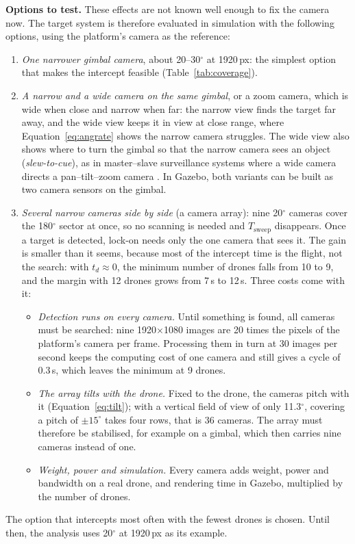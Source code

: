 \textbf{Options to test.} These effects are not known well enough to fix the
camera now. The target system is therefore evaluated in simulation with the
following options, using the platform's camera as the reference:
\begin{enumerate}
  \item \emph{One narrower gimbal camera}, about 20--30$^\circ$ at 1920\,px:
        the simplest option that makes the intercept feasible
        (Table~\ref{tab:coverage}).
  \item \emph{A narrow and a wide camera on the same gimbal}, or a zoom
        camera, which is wide when close and narrow when far: the narrow view
        finds the target far away, and the wide view keeps it in view at
        close range, where Equation~\eqref{eq:angrate} shows the narrow
        camera struggles. The wide view also shows where to turn the gimbal
        so that the narrow camera sees an object (\emph{slew-to-cue}), as in
        master--slave surveillance systems where a wide camera directs a
        pan--tilt--zoom camera \cite{delbimbo2010exploiting}. In Gazebo, both
        variants can be built as two camera sensors on the gimbal.
  \item \emph{Several narrow cameras side by side} (a camera array): nine
        20$^\circ$ cameras cover the 180$^\circ$ sector at once, so no
        scanning is needed and $T_{\mathrm{sweep}}$ disappears. Once a target
        is detected, lock-on needs only the one camera that sees it. The gain
        is smaller than it seems, because most of the intercept time is the
        flight, not the search: with $t_d \approx 0$, the minimum number of
        drones falls from 10 to 9, and the margin with 12 drones grows from
        7\,s to 12\,s. Three costs come with it:
        \begin{itemize}
          \item \emph{Detection runs on every camera.} Until something is
                found, all cameras must be searched: nine 1920$\times$1080
                images are 20 times the pixels of the platform's camera per
                frame. Processing them in turn at 30 images per second keeps
                the computing cost of one camera and still gives a cycle of
                0.3\,s, which leaves the minimum at 9 drones.
          \item \emph{The array tilts with the drone.} Fixed to the drone, the
                cameras pitch with it (Equation~\eqref{eq:tilt}); with a
                vertical field of view of only 11.3$^\circ$, covering a pitch
                of $\pm15^\circ$ takes four rows, that is 36 cameras. The
                array must therefore be stabilised, for example on a gimbal,
                which then carries nine cameras instead of one.
          \item \emph{Weight, power and simulation.} Every camera adds weight,
                power and bandwidth on a real drone, and rendering time in
                Gazebo, multiplied by the number of drones.
        \end{itemize}
\end{enumerate}
The option that intercepts most often with the fewest drones is chosen. Until
then, the analysis uses 20$^\circ$ at 1920\,px as its example.

